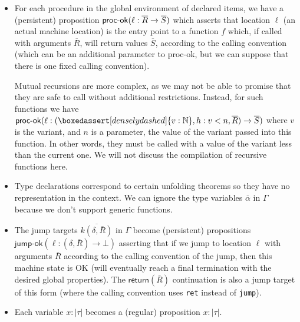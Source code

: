 \documentclass[acmsmall,nonacm]{acmart}
\newcommand*{\ghost}[1]{\boxedassert[densely dashed]{#1}}
\newcommand*{\N}{\mathbb{N}}
\newcommand{\core}[1]{\left| #1 \right|}
\begin{document}
\begin{itemize}
\item For each procedure in the global environment of declared items, we have a (persistent) proposition $\mbox{\textsf{proc-ok}}(\ell:\overline{R}\to\overline{S})$ which asserts that location $\ell$ (an actual machine location) is the entry point to a function $f$ which, if called with arguments $\overline{R}$, will return values $\overline{S}$, according to the calling convention (which can be an additional parameter to \textsf{proc-ok}, but we can suppose that there is one fixed calling convention).

Mutual recursions are more complex, as we may not be able to promise that they are safe to call without additional restrictions. Instead, for such functions we have $\mbox{\textsf{proc-ok}}(\ell:(\ghost{v:\N},h:v<n,\overline{R})\to\overline{S})$ where $v$ is the variant, and $n$ is a parameter, the value of the variant passed into this function. In other words, they must be called with a value of the variant less than the current one. We will not discuss the compilation of recursive functions here.

\item Type declarations correspond to certain unfolding theorems so they have no representation in the context. We can ignore the type variables $\overline{\alpha}$ in $\Gamma$ because we don't support generic functions.

\item The jump targets $\overline{k(\delta,\bar R)}$ in $\Gamma$ become (persistent) propositions $\textsf{jump-ok}(\ell:(\delta,\bar {R})\to \bot)$ asserting that if we jump to location $\ell$ with arguments $\bar {R}$ according to the calling convention of the jump, then this machine state is OK (will eventually reach a final termination with the desired global properties). The $\mathsf{return}(\bar R)$ continuation is also a jump target of this form (where the calling convention uses \texttt{ret} instead of \texttt{jump}).

\item Each variable $x:\core\tau$ becomes a (regular) proposition $\boxed{x:\core\tau}$.
\end{itemize}
\end{document}
